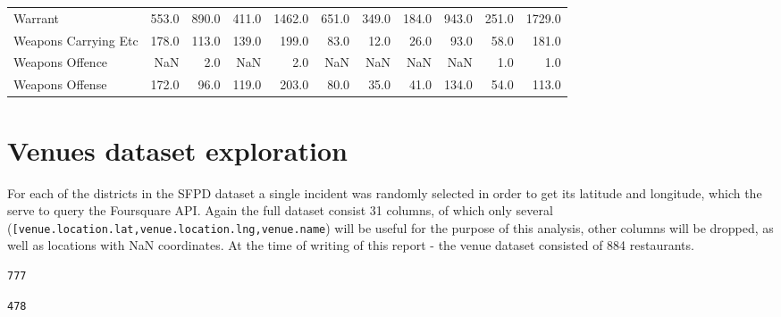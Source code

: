 \documentclass[10pt,parskip=half,
toc=sectionentrywithdots,
bibliography=totocnumbered,
captions=tableheading,numbers=noendperiod]{scrartcl}
\begin{document}
\begin{table}[H]
\begin{adjustbox}{max width=\textwidth}
{\begin{tabular}{lrrrrrrrrrr}
Warrant                                    &    553.0 &    890.0 &      411.0 &   1462.0 &     651.0 &   349.0 &     184.0 &     943.0 &    251.0 &      1729.0 \\
Weapons Carrying Etc                       &    178.0 &    113.0 &      139.0 &    199.0 &      83.0 &    12.0 &      26.0 &      93.0 &     58.0 &       181.0 \\
Weapons Offence                            &      NaN &      2.0 &        NaN &      2.0 &       NaN &     NaN &       NaN &       NaN &      1.0 &         1.0 \\
Weapons Offense                            &    172.0 &     96.0 &      119.0 &    203.0 &      80.0 &    35.0 &      41.0 &     134.0 &     54.0 &       113.0 \\
\bottomrule
\end{tabular}
}
\end{adjustbox}
\end{table}

\hypertarget{venues-dataset-exploration}{%
\section{Venues dataset exploration}\label{venues-dataset-exploration}}

For each of the districts in the SFPD dataset a single incident was
randomly selected in order to get its latitude and longitude, which the
serve to query the Foursquare API. Again the full dataset consist 31
columns, of which only several
(\texttt{{[}\textquotesingle{}venue.location.lat\textquotesingle{},\textquotesingle{}venue.location.lng\textquotesingle{},\textquotesingle{}venue.name\textquotesingle{}{]}})
will be useful for the purpose of this analysis, other columns will be
dropped, as well as locations with NaN coordinates. At the time of
writing of this report - the venue dataset consisted of 884 restaurants.

\begin{lstlisting}[language={},postbreak={},numbers=none,xrightmargin=7pt,belowskip=5pt,aboveskip=5pt,breakindent=0pt]
777

\end{lstlisting}

\begin{lstlisting}[language={},postbreak={},numbers=none,xrightmargin=7pt,belowskip=5pt,aboveskip=5pt,breakindent=0pt]
478

\end{lstlisting}
\end{document}
